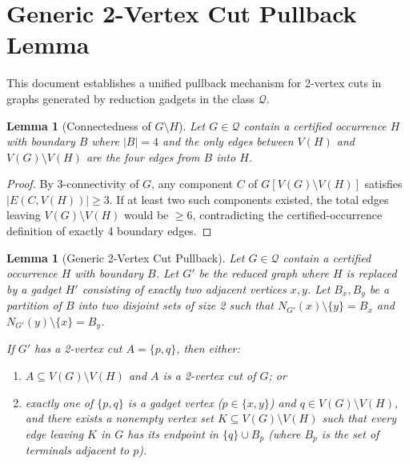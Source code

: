 \documentclass[12pt]{article}
\newtheorem{lemma}[theorem]{Lemma}
\begin{document}
\section*{Generic 2-Vertex Cut Pullback Lemma}

This document establishes a unified pullback mechanism for 2-vertex cuts in graphs generated by reduction gadgets in the class $\mathcal{Q}$.

\begin{lemma}[Connectedness of $G \setminus H$]
\label{lem:isolated_neighborhood}
Let $G \in \mathcal{Q}$ contain a certified occurrence $H$ with boundary $B$ where $|B|=4$ and the only edges between $V(H)$ and $V(G)\setminus V(H)$ are the four edges from $B$ into $H$.
\end{lemma}
\begin{proof}
By 3-connectivity of $G$, any component $C$ of $G[V(G)\setminus V(H)]$ satisfies $|E(C, V(H))| \ge 3$. If at least two such components existed, the total edges leaving $V(G)\setminus V(H)$ would be $\ge 6$, contradicting the certified-occurrence definition of exactly 4 boundary edges.
\end{proof}

\begin{lemma}[Generic 2-Vertex Cut Pullback]
\label{lem:pullback_generic}
Let $G \in \mathcal{Q}$ contain a certified occurrence $H$ with boundary $B$. Let $G'$ be the reduced graph where $H$ is replaced by a gadget $H'$ consisting of exactly two adjacent vertices $x, y$. Let $B_x, B_y$ be a partition of $B$ into two disjoint sets of size 2 such that $N_{G'}(x) \setminus \{y\} = B_x$ and $N_{G'}(y) \setminus \{x\} = B_y$.

If $G'$ has a 2-vertex cut $A = \{p, q\}$, then either:
\begin{enumerate}
    \item[(i)] $A \subseteq V(G) \setminus V(H)$ and $A$ is a 2-vertex cut of $G$; or
    \item[(ii)] exactly one of $\{p, q\}$ is a gadget vertex ($p \in \{x, y\}$) and $q \in V(G) \setminus V(H)$, and there exists a nonempty vertex set $K \subseteq V(G) \setminus V(H)$ such that every edge leaving $K$ in $G$ has its endpoint in $\{q\} \cup B_p$ (where $B_p$ is the set of terminals adjacent to $p$).
\end{enumerate}
\end{lemma}
\end{document}
